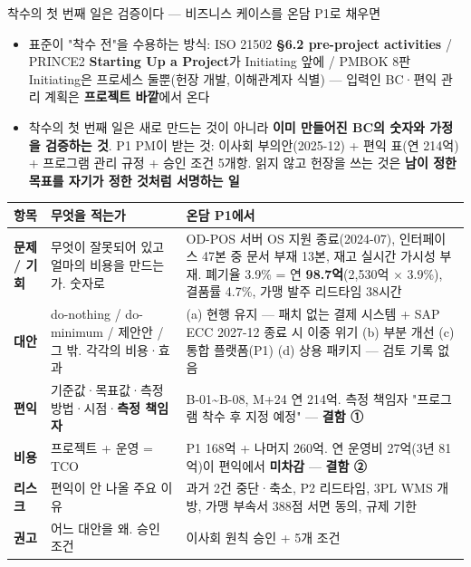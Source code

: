 \begin{frame}[allowframebreaks=1.0]{착수의 첫 번째 일은 검증이다 — 비즈니스 케이스를 온담 P1로 채우면}
\small
\begin{itemize}
\item\relax 표준이 "착수 전"을 수용하는 방식: ISO 21502 \textbf{§6.2 pre-project activities} / PRINCE2 \textbf{Starting Up a Project}가 Initiating 앞에 / PMBOK 8판 Initiating은 프로세스 둘뿐(헌장 개발, 이해관계자 식별) — 입력인 BC·편익 관리 계획은 \textbf{프로젝트 바깥}에서 온다
\item\relax 착수의 첫 번째 일은 새로 만드는 것이 아니라 \textbf{이미 만들어진 BC의 숫자와 가정을 검증하는 것}. P1 PM이 받는 것: 이사회 부의안(2025-12) + 편익 표(연 214억) + 프로그램 관리 규정 + 승인 조건 5개항. 읽지 않고 헌장을 쓰는 것은 \textbf{남이 정한 목표를 자기가 정한 것처럼 서명하는 일}
\end{itemize}
\framebreak
{\footnotesize\setlength{\tabcolsep}{3pt}\renewcommand{\arraystretch}{1.12}
\begin{tabular}{@{}>{\raggedright\arraybackslash}p{}>{\raggedright\arraybackslash}p{}>{\raggedright\arraybackslash}p{}@{}}
\toprule
\textbf{항목} & \textbf{무엇을 적는가} & \textbf{온담 P1에서} \\
\midrule
\textbf{문제 / 기회} & 무엇이 잘못되어 있고 얼마의 비용을 만드는가. 숫자로 & OD-POS 서버 OS 지원 종료(2024-07), 인터페이스 47본 중 문서 부재 13본, 재고 실시간 가시성 부재. 폐기율 3.9\% = 연 \textbf{98.7억}(2,530억 $\times$ 3.9\%), 결품률 4.7\%, 가맹 발주 리드타임 38시간 \\
\textbf{대안} & do-nothing / do-minimum / 제안안 / 그 밖. 각각의 비용·효과 & (a) 현행 유지 — 패치 없는 결제 시스템 + SAP ECC 2027-12 종료 시 이중 위기 (b) 부분 개선 (c) 통합 플랫폼(P1) (d) 상용 패키지 — 검토 기록 없음 \\
\textbf{편익} & 기준값·목표값·측정 방법·시점·\textbf{측정 책임자} & B-01\textasciitilde{}B-08, M+24 연 214억. 측정 책임자 "프로그램 착수 후 지정 예정" — \textbf{결함 ①} \\
\textbf{비용} & 프로젝트 + 운영 = TCO & P1 168억 + 나머지 260억. 연 운영비 27억(3년 81억)이 편익에서 \textbf{미차감} — \textbf{결함 ②} \\
\textbf{리스크} & 편익이 안 나올 주요 이유 & 과거 2건 중단·축소, P2 리드타임, 3PL WMS 개방, 가맹 부속서 388점 서면 동의, 규제 기한 \\
\textbf{권고} & 어느 대안을 왜. 승인 조건 & 이사회 원칙 승인 + 5개 조건 \\
\bottomrule
\end{tabular}}
\par\smallskip
{}
\end{frame}

